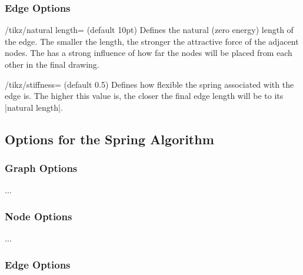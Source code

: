 
\subsubsection{Edge Options}

\begin{key}{/tikz/natural length= (default 10pt)}
  Defines the natural (zero energy) length of the edge. The smaller the
  length, the stronger the attractive force of the adjacent nodes. The
   has a strong influence of how far the nodes will be
  placed from each other in the final drawing.
  \begin{codeexample}[]
  \end{codeexample}
\end{key}

\begin{key}{/tikz/stiffness= (default 0.5)}
  Defines how flexible the spring associated with the edge is. The
  higher this value is, the closer the final edge length will be to its
  |natural length|.
  \begin{codeexample}[]
  \end{codeexample}
\end{key}

\subsection{Options for the Spring Algorithm}

\subsubsection{Graph Options}

...

\subsubsection{Node Options}

...

\subsubsection{Edge Options}

